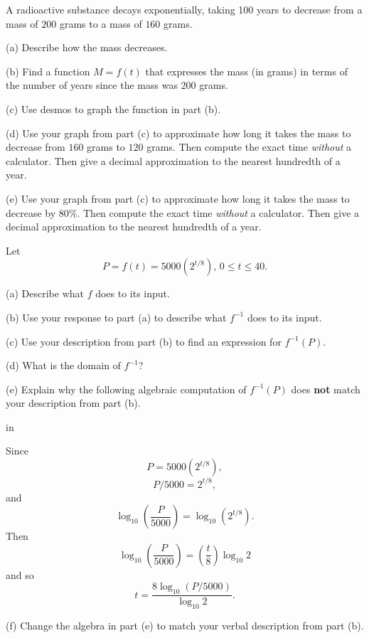 \documentclass{ximera}
\newcommand{\pskip}{\vskip 0.1 in}
\begin{document}
\begin{question}  \label{Q:dfbhhhhh}
A radioactive substance decays exponentially, taking 100 years to decrease from a mass of $200$ grams to a mass of $160$ grams.

(a) Describe how the mass decreases.

(b)  Find a function $M = f(t)$ that expresses the mass (in grams) in terms of the number of years since the mass was $200$ grams.

(c) Use desmos to graph the function in part (b). 

(d) Use your graph from part (c) to approximate how long it takes the mass to decrease from $160$ grams to $120$ grams. Then compute the exact time \emph{without} a calculator. Then give a decimal approximation to the nearest hundredth of a year.

(e) Use your graph from part (c) to approximate how long it takes the mass to decrease by $80\%$. Then compute the exact time \emph{without} a calculator. Then give a decimal approximation to the nearest hundredth of a year.


\end{question}



\begin{question} \label{Q5:LogF}
Let
\[
   P =  f(t) = 5000 (2^{t/8}) , \, 0\leq t \leq 40.
\]

(a) Describe what $f$ does to its input.

(b) Use your response to part (a) to describe what $f^{-1}$ does to its input.

(c) Use your description from part (b) to find an expression for $f^{-1}(P)$. 

(d) What is the domain of $f^{-1}$?

(e) Explain why the following algebraic computation of $f^{-1}(P)$ does {\bf not} match your description from part (b).

\pskip

Since
\[
   P = 5000 (2^{t/8}) ,
\]
\[
   P/5000 = 2^{t/8} ,
\]
and 
\[
   \log_{10}\left( \frac{P}{5000} \right) = \log_{10} (2^{t/8}) .
\]
Then
\[
   \log_{10}\left( \frac{P}{5000} \right) =  \left( \frac{t}{8}  \right)  \log_{10} 2 
\]
and so 
\[
    t = \frac{8 \log_{10}(P/5000)}{\log_{10} 2} .
\]

(f) Change the algebra in part (e) to match your verbal description from part (b).
\end{question}
\end{document}
